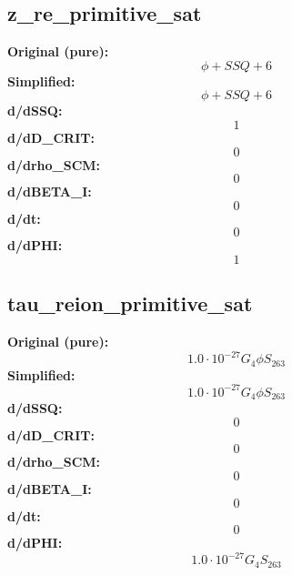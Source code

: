 \subsection{z_re_primitive_sat}
\textbf{Original (pure):}
\begin{equation}
\phi + SSQ + 6
\end{equation}
\textbf{Simplified:}
\begin{equation}
\phi + SSQ + 6
\end{equation}
\textbf{d/dSSQ:}
\begin{equation}
1
\end{equation}
\textbf{d/dD_CRIT:}
\begin{equation}
0
\end{equation}
\textbf{d/drho_SCM:}
\begin{equation}
0
\end{equation}
\textbf{d/dBETA_I:}
\begin{equation}
0
\end{equation}
\textbf{d/dt:}
\begin{equation}
0
\end{equation}
\textbf{d/dPHI:}
\begin{equation}
1
\end{equation}

\subsection{tau_reion_primitive_sat}
\textbf{Original (pure):}
\begin{equation}
1.0 \cdot 10^{-27} G_{4} \phi S_{26 3}
\end{equation}
\textbf{Simplified:}
\begin{equation}
1.0 \cdot 10^{-27} G_{4} \phi S_{26 3}
\end{equation}
\textbf{d/dSSQ:}
\begin{equation}
0
\end{equation}
\textbf{d/dD_CRIT:}
\begin{equation}
0
\end{equation}
\textbf{d/drho_SCM:}
\begin{equation}
0
\end{equation}
\textbf{d/dBETA_I:}
\begin{equation}
0
\end{equation}
\textbf{d/dt:}
\begin{equation}
0
\end{equation}
\textbf{d/dPHI:}
\begin{equation}
1.0 \cdot 10^{-27} G_{4} S_{26 3}
\end{equation}

